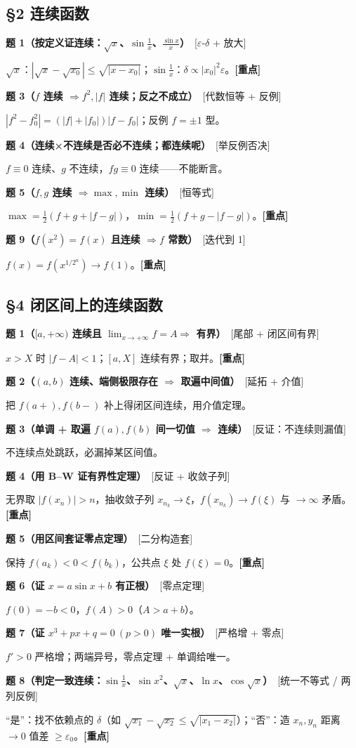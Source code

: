 \documentclass[11pt,a4paper,UTF8]{ctexart}
\newcommand{\eps}{\varepsilon}
\newcommand{\p}[2]{\par\smallskip\noindent\textbf{#1}\ \textcolor{blue!55!black}{[#2]}\par\nopagebreak}
\begin{document}
\subsection*{§2 连续函数}
\p{题 1（按定义证连续：$\sqrt x$、$\sin\frac1x$、$\frac{\sin x}x$）}{$\eps$-$\delta$ + 放大}
$\sqrt x$：$|\sqrt x-\sqrt{x_0}|\le\sqrt{|x-x_0|}$；$\sin\frac1x$：$\delta\propto|x_0|^2\eps$。\textbf{[重点]}

\p{题 3（$f$ 连续 $\Rightarrow f^2,|f|$ 连续；反之不成立）}{代数恒等 + 反例}
$|f^2-f_0^2|=(|f|+|f_0|)|f-f_0|$；反例 $f=\pm1$ 型。

\p{题 4（连续×不连续是否必不连续；都连续呢）}{举反例否决}
$f\equiv0$ 连续、$g$ 不连续，$fg\equiv0$ 连续——不能断言。

\p{题 5（$f,g$ 连续 $\Rightarrow\max,\min$ 连续）}{恒等式}
$\max=\frac12(f+g+|f-g|)$，$\min=\frac12(f+g-|f-g|)$。\textbf{[重点]}

\p{题 9（$f(x^2)=f(x)$ 且连续 $\Rightarrow f$ 常数）}{迭代到 1}
$f(x)=f(x^{1/2^n})\to f(1)$。\textbf{[重点]}

\subsection*{§4 闭区间上的连续函数}
\p{题 1（$[a,+\infty)$ 连续且 $\lim_{x\to+\infty}f=A\Rightarrow$ 有界）}{尾部 + 闭区间有界}
$x>X$ 时 $|f-A|<1$；$[a,X]$ 连续有界；取并。\textbf{[重点]}

\p{题 2（$(a,b)$ 连续、端侧极限存在 $\Rightarrow$ 取遍中间值）}{延拓 + 介值}
把 $f(a+),f(b-)$ 补上得闭区间连续，用介值定理。

\p{题 3（单调 + 取遍 $f(a),f(b)$ 间一切值 $\Rightarrow$ 连续）}{反证：不连续则漏值}
不连续点处跳跃，必漏掉某区间值。

\p{题 4（用 B–W 证有界性定理）}{反证 + 收敛子列}
无界取 $|f(x_n)|>n$，抽收敛子列 $x_{n_k}\to\xi$，$f(x_{n_k})\to f(\xi)$ 与 $\to\infty$ 矛盾。\textbf{[重点]}

\p{题 5（用区间套证零点定理）}{二分构造套}
保持 $f(a_k)<0<f(b_k)$，公共点 $\xi$ 处 $f(\xi)=0$。\textbf{[重点]}

\p{题 6（证 $x=a\sin x+b$ 有正根）}{零点定理}
$f(0)=-b<0$，$f(A)>0$（$A>a+b$）。

\p{题 7（证 $x^3+px+q=0\ (p>0)$ 唯一实根）}{严格增 + 零点}
$f'>0$ 严格增；两端异号，零点定理 + 单调给唯一。

\p{题 8（判定一致连续：$\sin\frac1x$、$\sin x^2$、$\sqrt x$、$\ln x$、$\cos\sqrt x$）}{统一不等式 / 两列反例}
“是”：找不依赖点的 $\delta$（如 $\sqrt{x_1}-\sqrt{x_2}\le\sqrt{|x_1-x_2|}$）；“否”：造 $x_n,y_n$ 距离 $\to0$ 值差 $\ge\eps_0$。\textbf{[重点]}
\end{document}

